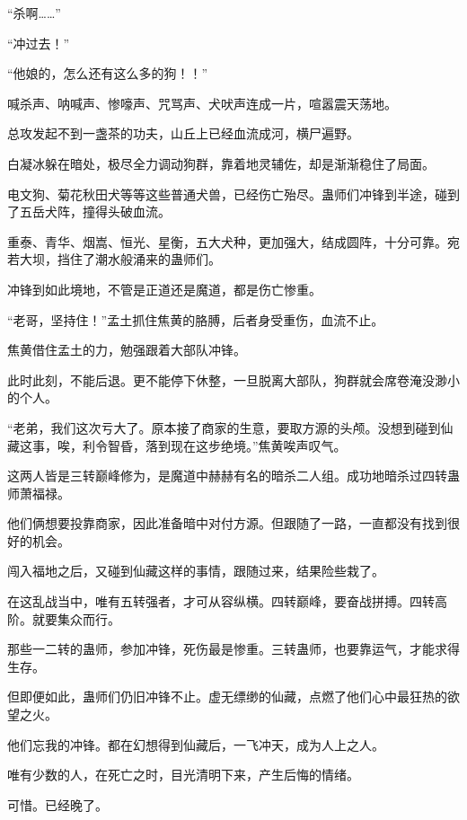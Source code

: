 
\begin{this_body}



“杀啊……”

“冲过去！”

“他娘的，怎么还有这么多的狗！！”

喊杀声、呐喊声、惨嚎声、咒骂声、犬吠声连成一片，喧嚣震天荡地。

总攻发起不到一盏茶的功夫，山丘上已经血流成河，横尸遍野。

白凝冰躲在暗处，极尽全力调动狗群，靠着地灵辅佐，却是渐渐稳住了局面。

电文狗、菊花秋田犬等等这些普通犬兽，已经伤亡殆尽。蛊师们冲锋到半途，碰到了五岳犬阵，撞得头破血流。

重泰、青华、烟嵩、恒光、星衡，五大犬种，更加强大，结成圆阵，十分可靠。宛若大坝，挡住了潮水般涌来的蛊师们。

冲锋到如此境地，不管是正道还是魔道，都是伤亡惨重。

“老哥，坚持住！”孟土抓住焦黄的胳膊，后者身受重伤，血流不止。

焦黄借住孟土的力，勉强跟着大部队冲锋。

此时此刻，不能后退。更不能停下休整，一旦脱离大部队，狗群就会席卷淹没渺小的个人。

“老弟，我们这次亏大了。原本接了商家的生意，要取方源的头颅。没想到碰到仙藏这事，唉，利令智昏，落到现在这步绝境。”焦黄唉声叹气。

这两人皆是三转巅峰修为，是魔道中赫赫有名的暗杀二人组。成功地暗杀过四转蛊师萧福禄。

他们俩想要投靠商家，因此准备暗中对付方源。但跟随了一路，一直都没有找到很好的机会。

闯入福地之后，又碰到仙藏这样的事情，跟随过来，结果险些栽了。

在这乱战当中，唯有五转强者，才可从容纵横。四转巅峰，要奋战拼搏。四转高阶。就要集众而行。

那些一二转的蛊师，参加冲锋，死伤最是惨重。三转蛊师，也要靠运气，才能求得生存。

但即便如此，蛊师们仍旧冲锋不止。虚无缥缈的仙藏，点燃了他们心中最狂热的欲望之火。

他们忘我的冲锋。都在幻想得到仙藏后，一飞冲天，成为人上之人。

唯有少数的人，在死亡之时，目光清明下来，产生后悔的情绪。

可惜。已经晚了。


\end{this_body}
